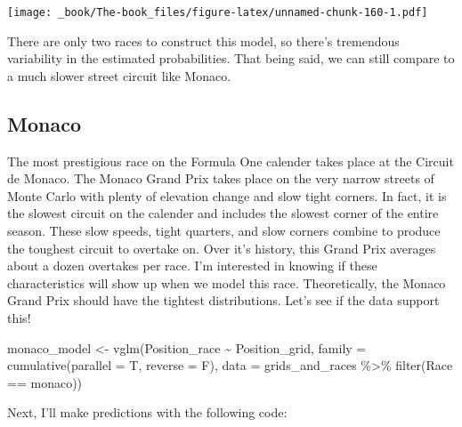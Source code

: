 \documentclass[
]{book}
\newenvironment{Shaded}{\begin{snugshade}}{\end{snugshade}}
\newcommand{\AttributeTok}[1]{\textcolor[rgb]{0.77,0.63,0.00}{#1}}
\newcommand{\FunctionTok}[1]{\textcolor[rgb]{0.00,0.00,0.00}{#1}}
\newcommand{\NormalTok}[1]{#1}
\newcommand{\OtherTok}[1]{\textcolor[rgb]{0.56,0.35,0.01}{#1}}
\newcommand{\SpecialCharTok}[1]{\textcolor[rgb]{0.00,0.00,0.00}{#1}}
\newcommand{\StringTok}[1]{\textcolor[rgb]{0.31,0.60,0.02}{#1}}
\begin{document}
\texttt{[image: \_book/The-book\_files/figure-latex/unnamed-chunk-160-1.pdf]}

There are only two races to construct this model, so there's tremendous variability in the estimated probabilities. That being said, we can still compare to a much slower street circuit like Monaco.

\hypertarget{monaco}{%
\subsection{Monaco}\label{monaco}}

The most prestigious race on the Formula One calender takes place at the Circuit de Monaco. The Monaco Grand Prix takes place on the very narrow streets of Monte Carlo with plenty of elevation change and slow tight corners. In fact, it is the slowest circuit on the calender and includes the slowest corner of the entire season. These slow speeds, tight quarters, and slow corners combine to produce the toughest circuit to overtake on. Over it's history, this Grand Prix averages about a dozen overtakes per race. I'm interested in knowing if these characteristics will show up when we model this race. Theoretically, the Monaco Grand Prix should have the tightest distributions. Let's see if the data support this!

\begin{Shaded}
\begin{Highlighting}[]
\NormalTok{monaco\_model }\OtherTok{\textless{}{-}} \FunctionTok{vglm}\NormalTok{(Position\_race }\SpecialCharTok{\textasciitilde{}}\NormalTok{ Position\_grid, }
                      \AttributeTok{family =} \FunctionTok{cumulative}\NormalTok{(}\AttributeTok{parallel =}\NormalTok{ T, }\AttributeTok{reverse =}\NormalTok{ F),}
                      \AttributeTok{data =}\NormalTok{ grids\_and\_races }\SpecialCharTok{\%\textgreater{}\%}
                       \FunctionTok{filter}\NormalTok{(Race }\SpecialCharTok{==} \StringTok{\textquotesingle{}monaco\textquotesingle{}}\NormalTok{))}
\end{Highlighting}
\end{Shaded}

Next, I'll make predictions with the following code:
\end{document}
